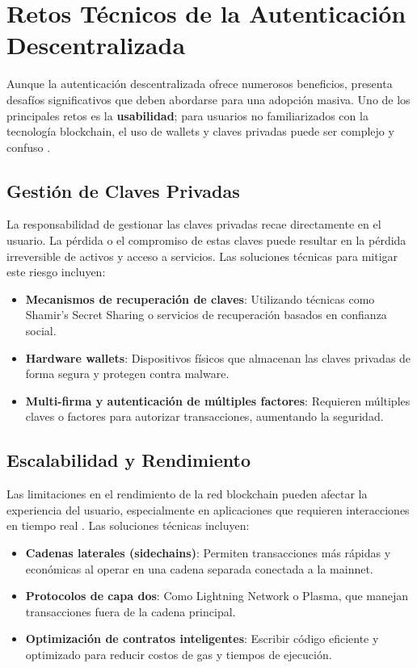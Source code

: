 \section{Retos Técnicos de la Autenticación Descentralizada}

Aunque la autenticación descentralizada ofrece numerosos beneficios, presenta desafíos significativos que deben abordarse para una adopción masiva. Uno de los principales retos es la \textbf{usabilidad}; para usuarios no familiarizados con la tecnología blockchain, el uso de wallets y claves privadas puede ser complejo y confuso \cite{parizi2018empirical}.

\subsection{Gestión de Claves Privadas}

La responsabilidad de gestionar las claves privadas recae directamente en el usuario. La pérdida o el compromiso de estas claves puede resultar en la pérdida irreversible de activos y acceso a servicios. Las soluciones técnicas para mitigar este riesgo incluyen:

\begin{itemize}
    \item \textbf{Mecanismos de recuperación de claves}: Utilizando técnicas como Shamir's Secret Sharing o servicios de recuperación basados en confianza social.
    \item \textbf{Hardware wallets}: Dispositivos físicos que almacenan las claves privadas de forma segura y protegen contra malware.
    \item \textbf{Multi-firma y autenticación de múltiples factores}: Requieren múltiples claves o factores para autorizar transacciones, aumentando la seguridad.
\end{itemize}

\subsection{Escalabilidad y Rendimiento}

Las limitaciones en el rendimiento de la red blockchain pueden afectar la experiencia del usuario, especialmente en aplicaciones que requieren interacciones en tiempo real \cite{croman2016scaling}. Las soluciones técnicas incluyen:

\begin{itemize}
    \item \textbf{Cadenas laterales (sidechains)}: Permiten transacciones más rápidas y económicas al operar en una cadena separada conectada a la mainnet.
    \item \textbf{Protocolos de capa dos}: Como Lightning Network o Plasma, que manejan transacciones fuera de la cadena principal.
    \item \textbf{Optimización de contratos inteligentes}: Escribir código eficiente y optimizado para reducir costos de gas y tiempos de ejecución.
\end{itemize}

